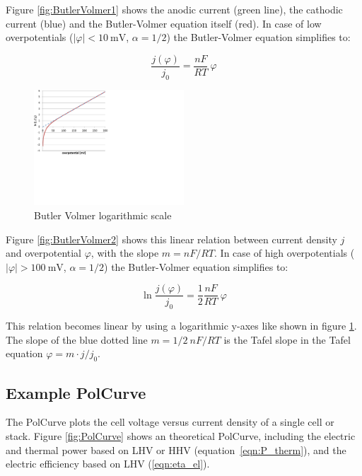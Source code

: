 \documentclass[11pt,a4paper,english,twoside]{scrreprt}
\begin{document}
Figure \ref{fig:ButlerVolmer1} shows the anodic current (green line), the cathodic current (blue) and the Butler-Volmer equation itself (red). In case of low overpotentials ($\left|\varphi\right| < \SI{10}{\milli\volt}$, $\alpha = 1/2$) the Butler-Volmer equation simplifies to:

\[
\frac{j(\varphi)}{j_0} = \frac{n F}{RT}\: \varphi 
\]


\begin{figure}  
  \centering
  \includegraphics*[width=0.5\textwidth,angle=0]{FCF_Chart_ButlerVolmer3.pdf}
  \caption[Butler Volmer logarithmic scale]{Butler Volmer logarithmic scale}
  \label{fig:ButlerVolmerLog}
\end{figure}

Figure \ref{fig:ButlerVolmer2} shows this linear relation between current density $j$ and overpotential $\varphi$, with the slope $m=nF/RT$. In case of high overpotentials ($\left|\varphi\right| > \SI{100}{\milli\volt}$, $\alpha = 1/2$) the Butler-Volmer equation simplifies to:

\[
\ln \frac{j(\varphi)}{j_0} = \frac12 \frac{n F}{RT}\: \varphi 
\]

This relation becomes linear by using a logarithmic y-axes like shown in figure \ref{fig:ButlerVolmerLog}. The slope of the blue dotted line $m=1/2\ nF/RT$ is the Tafel slope in the Tafel equation $\varphi = m \cdot j/j_0$. 



\subsection{Example PolCurve}

The PolCurve plots the cell voltage versus current density of a single cell or stack. Figure \ref{fig:PolCurve} shows an theoretical PolCurve, including the electric and thermal power based on LHV or HHV (equation~\ref{eqn:P_therm}), and the electric efficiency based on LHV (\ref{eqn:eta_el}).
\end{document}
